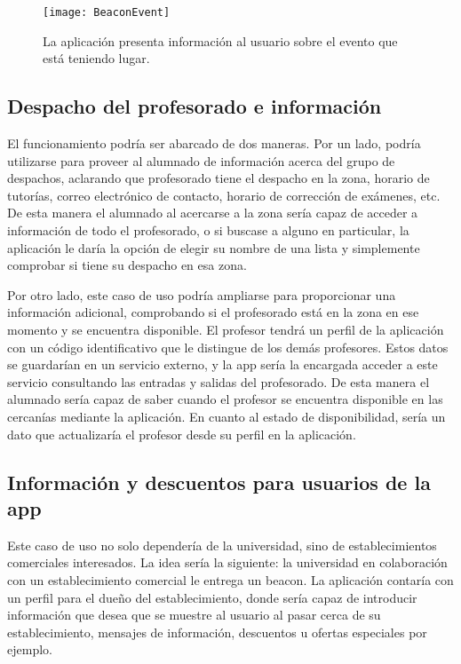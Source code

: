 \begin{figure}[H]
	\centering
	\texttt{[image: BeaconEvent]}
	\label{fig:eventBeacon}
	\caption{La aplicación presenta información al usuario sobre el evento que está teniendo lugar.}
\end{figure}

\subsection{Despacho del profesorado e información}

El funcionamiento podría ser abarcado de dos maneras. Por un lado, podría utilizarse para proveer al alumnado de información acerca del grupo de despachos, aclarando que profesorado tiene el despacho en la zona, horario de tutorías, correo electrónico de contacto, horario de corrección de exámenes, etc. De esta manera el alumnado al acercarse a la zona sería capaz de acceder a información de todo el profesorado, o si buscase a alguno en particular, la aplicación le daría la opción de elegir su nombre de una lista y simplemente comprobar si tiene su despacho en esa zona. 

Por otro lado, este caso de uso podría ampliarse para proporcionar una información adicional, comprobando si el profesorado está en la zona en ese momento y se encuentra disponible. El profesor tendrá un perfil de la aplicación con un código identificativo que le distingue de los demás profesores. Estos datos se guardarían en un servicio externo, y la app sería la encargada acceder a este servicio consultando las entradas y salidas del profesorado. De esta manera el alumnado sería capaz de saber cuando el profesor se encuentra disponible en las cercanías mediante la aplicación. En cuanto al estado de disponibilidad, sería un dato que actualizaría el profesor desde su perfil en la aplicación. 

\subsection{Información y descuentos para usuarios de la app}

Este caso de uso no solo dependería de la universidad, sino de establecimientos comerciales interesados. La idea sería la siguiente: la universidad en colaboración con un establecimiento comercial le entrega un beacon. La aplicación contaría con un perfil para el dueño del establecimiento, donde sería capaz de introducir información que desea que se muestre al usuario al pasar cerca de su establecimiento, mensajes de información, descuentos u ofertas especiales por ejemplo. 

